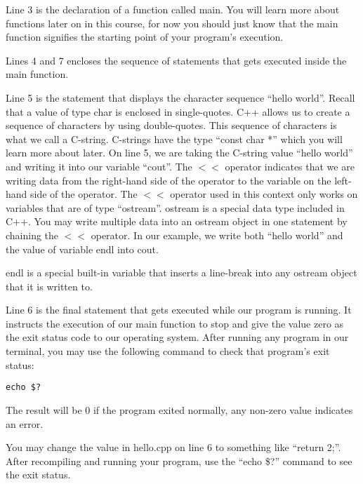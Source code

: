 \documentclass[a4paper,12pt]{article}
\begin{document}
Line 3 is the declaration of a function called main. You will learn more about functions later on in this course, for now you should just know that the main function signifies the starting point of your program's execution. 

Lines 4 and 7 encloses the sequence of statements that gets executed inside the main function.

Line 5 is the statement that displays the character sequence ``hello world''. Recall that a value of type char is enclosed in single-quotes. C++ allows us to create a sequence of characters by using double-quotes. This sequence of characters is what we call a C-string. C-strings have the type ``const char *'' which you will learn more about later. On line 5, we are taking the C-string value ``hello world'' and writing it into our variable ``cout''. The $<<$ operator indicates that we are writing data from the right-hand side of the operator to the variable on the left-hand side of the operator. The $<<$ operator used in this context only works on variables that are of type ``ostream''. ostream is a special data type included in C++. You may write multiple data into an ostream object in one statement by chaining the $<<$ operator. In our example, we write both ``hello world'' and the value of variable endl into cout. 

endl is a special built-in variable that inserts a line-break into any ostream object that it is written to.

Line 6 is the final statement that gets executed while our program is running. It instructs the execution of our main function to stop and give the value zero as the exit status code to our operating system. After running any program in our terminal, you may use the following command to check that program's exit status:

\lstset{numbers=none}
\begin{lstlisting}
echo $?
\end{lstlisting}

The result will be 0 if the program exited normally, any non-zero value indicates an error.

You may change the value in hello.cpp on line 6 to something like ``return 2;''. After recompiling and running your program, use the ``echo \$?'' command to see the exit status.
\end{document}
